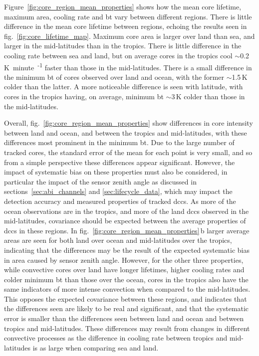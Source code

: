 Figure~\ref{fig:core_region_mean_properties} shows how the mean core lifetime, maximum area, cooling rate and \acrshort{bt} vary between different regions.
There is little difference in the mean core lifetime between regions, echoing the results seen in fig.~\ref{fig:core_lifetime_map}.
Maximum core area is larger over land than sea, and larger in the mid-latitudes than in the tropics.
There is little difference in the cooling rate between sea and land, but on average cores in the tropics cool $\sim$0.2\,\unit{K minute\textsuperscript{-1}} faster than those in the mid-latitudes.
There is a small difference in the minimum \acrshort{bt} of cores observed over land and ocean, with the former $\sim$1.5\,\unit{K} colder than the latter.
A more noticeable difference is seen with latitude, with cores in the tropics having, on average, minimum \acrshort{bt} $\sim$3\,\unit{K} colder than those in the mid-latitudes.

Overall, fig.~\ref{fig:core_region_mean_properties} show differences in core intensity between land and ocean, and between the tropics and mid-latitudes, with these differences most prominent in the minimum \acrshort{bt}.
Due to the large number of tracked cores, the standard error of the mean for each point is very small, and so from a simple perspective these differences appear significant.
However, the impact of systematic bias on these properties must also be considered, in particular the impact of the sensor zenith angle as discussed in sections~\ref{sec:abi_channels} and \ref{sec:lifecycle_data}, which may impact the detection accuracy and measured properties of tracked \acrshort{dcc}s.
As more of the ocean observations are in the tropics, and more of the land \acrshort{dcc}s observed in the mid-latitudes, covariance should be expected between the average properties of \acrshort{dcc}s in these regions.
In fig.~\ref{fig:core_region_mean_properties}\,b larger average areas are seen for both land over ocean and mid-latitudes over the tropics, indicating that the differences may be the result of the expected systematic bias in area caused by sensor zenith angle.
However, for the other three properties, while convective cores over land have longer lifetimes, higher cooling rates and colder minimum \acrshort{bt} than those over the ocean, cores in the tropics also have the same indicators of more intense convection when compared to the mid-latitudes.
This opposes the expected covariance between these regions, and indicates that the differences seen are likely to be real and significant, and that the systematic error is smaller than the differences seen between land and ocean and between tropics and mid-latitudes.
These differences may result from changes in different convective processes as the difference in cooling rate between tropics and mid-latitudes is as large when comparing sea and land.

